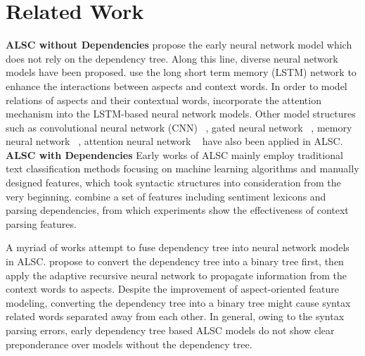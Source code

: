 \documentclass[11pt]{article}
\begin{document}
\section{Related Work}
\textbf{ALSC without Dependencies} \citet{DBLP:conf/ijcai/VoZ15} propose the early neural network model which does not rely on the dependency tree. Along this line, diverse neural network models have been proposed. \citet{DBLP:conf/coling/TangQFL16} use the long short term memory (LSTM) network to enhance the interactions between aspects and context words. In order to model relations of aspects and their contextual words, \citet{DBLP:conf/emnlp/WangHZZ16,DBLP:conf/eacl/ZhangL17,DBLP:conf/ijcai/MaLZW17,DBLP:conf/aaai/TayTH18a} incorporate the attention mechanism into the LSTM-based neural network models. Other model structures such as convolutional neural network (CNN) ~\citep{DBLP:conf/acl/LamLSB18,DBLP:conf/acl/LiX18}, gated neural network ~\citep{DBLP:conf/aaai/ZhangZV16,DBLP:conf/acl/LiX18}, memory neural network ~\citep{DBLP:conf/emnlp/TangQL16,DBLP:conf/emnlp/ChenSBY17, wang-etal-2018-target}, attention neural network ~\citep{tang2019progressive} have also been applied in ALSC.\newline
\textbf{ALSC with Dependencies}  Early works of ALSC mainly employ traditional text classification methods focusing on machine learning algorithms and manually designed features, which took syntactic structures into consideration from the very beginning.  \citet{DBLP:conf/semeval/KiritchenkoZCM14} combine a set of features including sentiment lexicons and parsing dependencies, from which experiments show the effectiveness of context parsing features.


A myriad of works attempt to fuse dependency tree into neural network models in ALSC.  \citet{DBLP:conf/acl/DongWTTZX14} propose to convert the dependency tree into a binary tree first, then apply the adaptive recursive neural network to propagate information from the context words to aspects. Despite the improvement of aspect-oriented feature modeling, converting the dependency tree into a binary tree might cause syntax related words separated away from each other. In general, owing to the syntax parsing errors, early dependency tree based ALSC models  do not show clear preponderance over models without the dependency tree.
\end{document}
